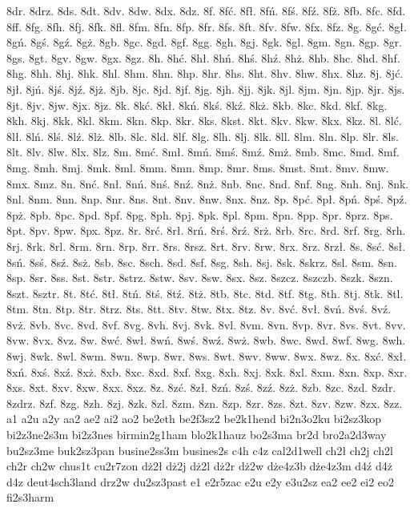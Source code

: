{8dr.
8drz.
8ds.
8dt.
8dv.
8dw.
8dx.
8dz.
8f.
8fć.
8fł.
8fń.
8fś.
8fź.
8fż.
8fb.
8fc.
8fd.
8ff.
8fg.
8fh.
8fj.
8fk.
8fl.
8fm.
8fn.
8fp.
8fr.
8fs.
8ft.
8fv.
8fw.
8fx.
8fz.
8g.
8gć.
8gł.
8gń.
8gś.
8gź.
8gż.
8gb.
8gc.
8gd.
8gf.
8gg.
8gh.
8gj.
8gk.
8gl.
8gm.
8gn.
8gp.
8gr.
8gs.
8gt.
8gv.
8gw.
8gx.
8gz.
8h.
8hć.
8hł.
8hń.
8hś.
8hź.
8hż.
8hb.
8hc.
8hd.
8hf.
8hg.
8hh.
8hj.
8hk.
8hl.
8hm.
8hn.
8hp.
8hr.
8hs.
8ht.
8hv.
8hw.
8hx.
8hz.
8j.
8jć.
8jł.
8jń.
8jś.
8jź.
8jż.
8jb.
8jc.
8jd.
8jf.
8jg.
8jh.
8jj.
8jk.
8jl.
8jm.
8jn.
8jp.
8jr.
8js.
8jt.
8jv.
8jw.
8jx.
8jz.
8k.
8kć.
8kł.
8kń.
8kś.
8kź.
8kż.
8kb.
8kc.
8kd.
8kf.
8kg.
8kh.
8kj.
8kk.
8kl.
8km.
8kn.
8kp.
8kr.
8ks.
8kst.
8kt.
8kv.
8kw.
8kx.
8kz.
8l.
8lć.
8lł.
8lń.
8lś.
8lź.
8lż.
8lb.
8lc.
8ld.
8lf.
8lg.
8lh.
8lj.
8lk.
8ll.
8lm.
8ln.
8lp.
8lr.
8ls.
8lt.
8lv.
8lw.
8lx.
8lz.
8m.
8mć.
8mł.
8mń.
8mś.
8mź.
8mż.
8mb.
8mc.
8md.
8mf.
8mg.
8mh.
8mj.
8mk.
8ml.
8mm.
8mn.
8mp.
8mr.
8ms.
8mst.
8mt.
8mv.
8mw.
8mx.
8mz.
8n.
8nć.
8nł.
8nń.
8nś.
8nź.
8nż.
8nb.
8nc.
8nd.
8nf.
8ng.
8nh.
8nj.
8nk.
8nl.
8nm.
8nn.
8np.
8nr.
8ns.
8nt.
8nv.
8nw.
8nx.
8nz.
8p.
8pć.
8pł.
8pń.
8pś.
8pź.
8pż.
8pb.
8pc.
8pd.
8pf.
8pg.
8ph.
8pj.
8pk.
8pl.
8pm.
8pn.
8pp.
8pr.
8prz.
8ps.
8pt.
8pv.
8pw.
8px.
8pz.
8r.
8rć.
8rł.
8rń.
8rś.
8rź.
8rż.
8rb.
8rc.
8rd.
8rf.
8rg.
8rh.
8rj.
8rk.
8rl.
8rm.
8rn.
8rp.
8rr.
8rs.
8rsz.
8rt.
8rv.
8rw.
8rx.
8rz.
8rzł.
8s.
8sć.
8sł.
8sń.
8sś.
8sź.
8sż.
8sb.
8sc.
8sch.
8sd.
8sf.
8sg.
8sh.
8sj.
8sk.
8skrz.
8sl.
8sm.
8sn.
8sp.
8sr.
8ss.
8st.
8str.
8strz.
8stw.
8sv.
8sw.
8sx.
8sz.
8szcz.
8szczb.
8szk.
8szn.
8szt.
8sztr.
8t.
8tć.
8tł.
8tń.
8tś.
8tź.
8tż.
8tb.
8tc.
8td.
8tf.
8tg.
8th.
8tj.
8tk.
8tl.
8tm.
8tn.
8tp.
8tr.
8trz.
8ts.
8tt.
8tv.
8tw.
8tx.
8tz.
8v.
8vć.
8vł.
8vń.
8vś.
8vź.
8vż.
8vb.
8vc.
8vd.
8vf.
8vg.
8vh.
8vj.
8vk.
8vl.
8vm.
8vn.
8vp.
8vr.
8vs.
8vt.
8vv.
8vw.
8vx.
8vz.
8w.
8wć.
8wł.
8wń.
8wś.
8wź.
8wż.
8wb.
8wc.
8wd.
8wf.
8wg.
8wh.
8wj.
8wk.
8wl.
8wm.
8wn.
8wp.
8wr.
8ws.
8wt.
8wv.
8ww.
8wx.
8wz.
8x.
8xć.
8xł.
8xń.
8xś.
8xź.
8xż.
8xb.
8xc.
8xd.
8xf.
8xg.
8xh.
8xj.
8xk.
8xl.
8xm.
8xn.
8xp.
8xr.
8xs.
8xt.
8xv.
8xw.
8xx.
8xz.
8z.
8zć.
8zł.
8zń.
8zś.
8zź.
8zż.
8zb.
8zc.
8zd.
8zdr.
8zdrz.
8zf.
8zg.
8zh.
8zj.
8zk.
8zl.
8zm.
8zn.
8zp.
8zr.
8zs.
8zt.
8zv.
8zw.
8zx.
8zz.
a1
a2u
a2y
aa2
ae2
ai2
ao2
be2eth
be2f3sz2
be2k1hend
bi2n3o2ku
bi2sz3kop
bi2z3ne2s3m
bi2z3nes
birmin2g1ham
blo2k1hauz
bo2s3ma
br2d
bro2a2d3way
bu2sz3me
buk2sz3pan
busine2ss3m
busines2s
c4h
c4z
cal2d1well
ch2ł
ch2j
ch2l
ch2r
ch2w
chus1t
cu2r7zon
dż2ł
dż2j
dż2l
dż2r
dż2w
dże4z3b
dże4z3m
d4ź
d4ż
d4z
deut4sch3land
drz2w
du2sz3past
e1
e2r5zac
e2u
e2y
e3u2sz
ea2
ee2
ei2
eo2
fi2s3harm
}
